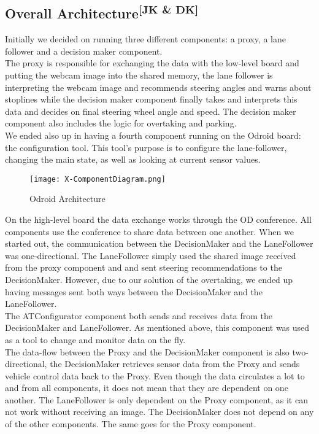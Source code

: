 \subsection[Overall Architecture]
{Overall Architecture\textsuperscript{[JK \& DK]}}
Initially we decided on running three different components: a proxy, a lane
follower and a decision maker component.\\
The proxy is responsible for exchanging the data with the low-level board and
putting the webcam image into the shared memory, the lane follower is
interpreting the webcam image and recommends steering angles and warns about
stoplines while the decision maker component finally takes and interprets this
data and decides on final steering wheel angle and speed. The decision maker
component also includes the logic for overtaking and parking.\\
We ended also up in having a fourth component running on the Odroid board: the
configuration tool. This tool’s purpose is to configure the lane-follower,
changing the main state, as well as looking at current sensor values.
\begin{figure}[ht]
  \centering
  \texttt{[image: X-ComponentDiagram.png]}
  \caption{Odroid Architecture}
  \label{xcompdiagr}
\end{figure}
\newpage
\noindent
On the high-level board the data exchange works through the OD conference. All
components use the conference to share data between one another. When we started
out, the communication between the DecisionMaker and the LaneFollower was
one-directional. The LaneFollower simply used the shared image received from the
proxy component and and sent steering recommendations to the DecisionMaker.
However, due to our solution of the overtaking, we ended up having messages sent
both ways between the DecisionMaker and the LaneFollower.\\
The ATConfigurator component both sends and receives data from the DecisionMaker
and LaneFollower. As mentioned above, this component was used as a tool to
change and monitor data on the fly.\\
The data-flow between the Proxy and the DecisionMaker component is also
two-directional, the DecisionMaker retrieves sensor data from the Proxy and
sends vehicle control data back to the Proxy. Even though the data circulates a
lot to and from all components, it does not mean that they are dependent on one
another. The LaneFollower is only dependent on the Proxy component, as it can
not work without receiving an image. The DecisionMaker does not depend on any of
the other components. The same goes for the Proxy component.

